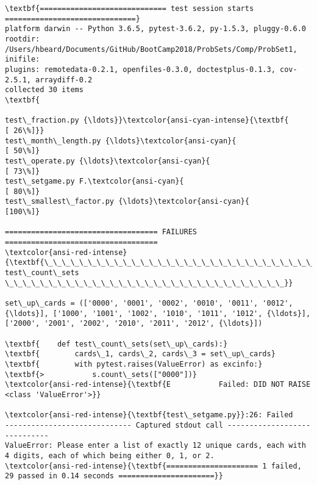 \documentclass[11pt]{article}
\begin{document}
    \begin{Verbatim}[commandchars=\\\{\}]
\textbf{============================= test session starts ==============================}
platform darwin -- Python 3.6.5, pytest-3.6.2, py-1.5.3, pluggy-0.6.0
rootdir: /Users/hbeard/Documents/GitHub/BootCamp2018/ProbSets/Comp/ProbSet1, inifile:
plugins: remotedata-0.2.1, openfiles-0.3.0, doctestplus-0.1.3, cov-2.5.1, arraydiff-0.2
collected 30 items                                                             \textbf{

test\_fraction.py {\ldots}}\textcolor{ansi-cyan-intense}{\textbf{                                                [ 26\%]}}
test\_month\_length.py {\ldots}\textcolor{ansi-cyan}{                                             [ 50\%]}
test\_operate.py {\ldots}\textcolor{ansi-cyan}{                                                  [ 73\%]}
test\_setgame.py F.\textcolor{ansi-cyan}{                                                       [ 80\%]}
test\_smallest\_factor.py {\ldots}\textcolor{ansi-cyan}{                                           [100\%]}

=================================== FAILURES ===================================
\textcolor{ansi-red-intense}{\textbf{\_\_\_\_\_\_\_\_\_\_\_\_\_\_\_\_\_\_\_\_\_\_\_\_\_\_\_\_\_\_\_ test\_count\_sets \_\_\_\_\_\_\_\_\_\_\_\_\_\_\_\_\_\_\_\_\_\_\_\_\_\_\_\_\_\_\_\_}}

set\_up\_cards = (['0000', '0001', '0002', '0010', '0011', '0012', {\ldots}], ['1000', '1001', '1002', '1010', '1011', '1012', {\ldots}], ['2000', '2001', '2002', '2010', '2011', '2012', {\ldots}])

\textbf{    def test\_count\_sets(set\_up\_cards):}
\textbf{        cards\_1, cards\_2, cards\_3 = set\_up\_cards}
\textbf{        with pytest.raises(ValueError) as excinfo:}
\textbf{>           s.count\_sets(["0000"])}
\textcolor{ansi-red-intense}{\textbf{E           Failed: DID NOT RAISE <class 'ValueError'>}}

\textcolor{ansi-red-intense}{\textbf{test\_setgame.py}}:26: Failed
----------------------------- Captured stdout call -----------------------------
ValueError: Please enter a list of exactly 12 unique cards, each with 4 digits, each of which being either 0, 1, or 2.
\textcolor{ansi-red-intense}{\textbf{===================== 1 failed, 29 passed in 0.14 seconds ======================}}

    \end{Verbatim}
\end{document}
